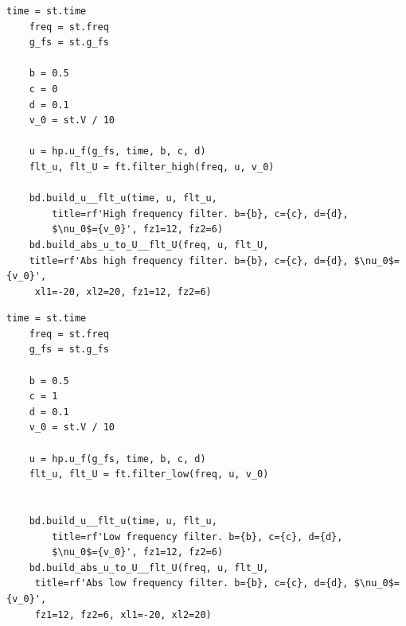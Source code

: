 \documentclass[a4paper, 12pt]{article}
\begin{document}
    \begin{lstlisting}[label=l5, caption={Файл nohigh.py. Фильтрация высоких частот.}]
    time = st.time
    freq = st.freq
    g_fs = st.g_fs
        
    b = 0.5
    c = 0
    d = 0.1
    v_0 = st.V / 10
        
    u = hp.u_f(g_fs, time, b, c, d)
    flt_u, flt_U = ft.filter_high(freq, u, v_0)
        
    bd.build_u__flt_u(time, u, flt_u,
        title=rf'High frequency filter. b={b}, c={c}, d={d},
        $\nu_0$={v_0}', fz1=12, fz2=6)
    bd.build_abs_u_to_U__flt_U(freq, u, flt_U,
    title=rf'Abs high frequency filter. b={b}, c={c}, d={d}, $\nu_0$={v_0}',
     xl1=-20, xl2=20, fz1=12, fz2=6)
    \end{lstlisting}
    \begin{lstlisting}[label=l6, caption={Файл nolow.py. Фильтрация низких частот.}]
    time = st.time
    freq = st.freq
    g_fs = st.g_fs
        
    b = 0.5
    c = 1
    d = 0.1
    v_0 = st.V / 10
        
    u = hp.u_f(g_fs, time, b, c, d)
    flt_u, flt_U = ft.filter_low(freq, u, v_0)
        
        
    bd.build_u__flt_u(time, u, flt_u,
        title=rf'Low frequency filter. b={b}, c={c}, d={d},
        $\nu_0$={v_0}', fz1=12, fz2=6)
    bd.build_abs_u_to_U__flt_U(freq, u, flt_U,
     title=rf'Abs low frequency filter. b={b}, c={c}, d={d}, $\nu_0$={v_0}',
     fz1=12, fz2=6, xl1=-20, xl2=20)
    \end{lstlisting}
\end{document}
